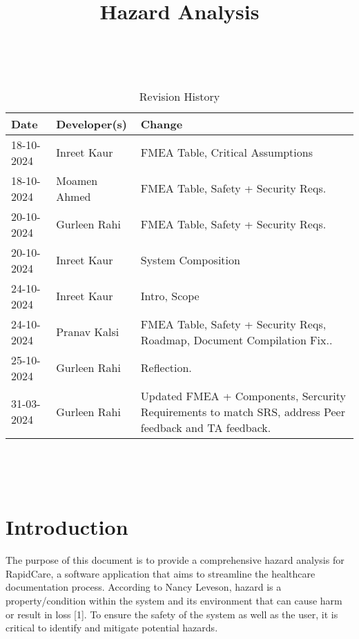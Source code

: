 \documentclass{article}
\title{Hazard Analysis\\\progname}
\author{\authname}
\date{}
\begin{document}
\maketitle
\thispagestyle{empty}

~\newpage


\begin{table}[hp]
\caption{Revision History} \label{TblRevisionHistory}
\begin{tabularx}{\textwidth}{llX}
\toprule
\textbf{Date} & \textbf{Developer(s)} & \textbf{Change}\\
\midrule
18-10-2024 & Inreet Kaur & FMEA Table, Critical Assumptions\\
18-10-2024 & Moamen Ahmed & FMEA Table, Safety + Security Reqs.\\
20-10-2024 & Gurleen Rahi & FMEA Table, Safety + Security Reqs.\\
20-10-2024 & Inreet Kaur & System Composition\\
24-10-2024 & Inreet Kaur & Intro, Scope\\
24-10-2024 & Pranav Kalsi & FMEA Table, Safety + Security Reqs, Roadmap, Document Compilation Fix..\\
25-10-2024 & Gurleen Rahi & Reflection.\\
31-03-2024 & Gurleen Rahi & Updated FMEA + Components, Sercurity Requirements to match SRS, address Peer feedback and TA feedback. \\
\bottomrule
\end{tabularx}
\end{table}

~\newpage

\tableofcontents

~\newpage



\section{Introduction}

The purpose of this document is to provide a comprehensive hazard analysis for RapidCare, a software application that aims to streamline the healthcare documentation process. According to Nancy Leveson, hazard is a property/condition within the system and its environment that can cause harm or result in loss [1]. To ensure the safety of the system as well as the user, it is critical to identify and mitigate potential hazards.
\end{document}

